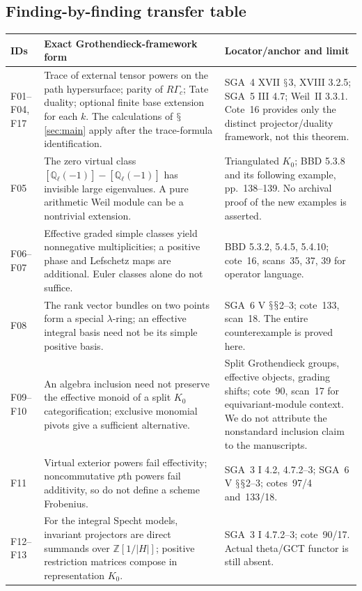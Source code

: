 \documentclass[11pt,a4paper]{article}
\newcommand{\Q}{\mathbb Q}\newcommand{\Z}{\mathbb Z}\newcommand{\C}{\mathbb C}\newcommand{\N}{\mathbb N}\newcommand{\F}{\mathbb F}
\renewcommand{\S}{\ensuremath{\mathsection}}
\theoremstyle{named}\newtheorem{finding}{Finding}[section]
\theoremstyle{definition}\newtheorem{definition}[finding]{Definition}
\theoremstyle{remark}\newtheorem{remark}[finding]{Remark}
\begin{document}
\subsection{Finding-by-finding transfer table}
{\small\begin{longtable}{p{.12\linewidth}p{.48\linewidth}p{.32\linewidth}}
\toprule IDs&Exact Grothendieck-framework form&Locator/anchor and limit\\\midrule\endhead
F01--F04, F17&Trace of external tensor powers on the path hypersurface; parity of $R\Gamma_c$; Tate duality; optional finite base extension for each $k$. The calculations of \S\ref{sec:main} apply after the trace-formula identification.&SGA~4 XVII \S3, XVIII 3.2.5; SGA~5 III 4.7; Weil~II 3.3.1. Cote~16 provides only the distinct projector/duality framework, not this theorem.\\
F05&The zero virtual class $[\Q_\ell(-1)]-[\Q_\ell(-1)]$ has invisible large eigenvalues. A pure arithmetic Weil module can be a nontrivial extension.&Triangulated $K_0$; BBD 5.3.8 and its following example, pp.~138--139. No archival proof of the new examples is asserted.\\
F06--F07&Effective graded simple classes yield nonnegative multiplicities; a positive phase and Lefschetz maps are additional. Euler classes alone do not suffice.&BBD 5.3.2, 5.4.5, 5.4.10; cote~16, scans~35, 37, 39 for operator language.\\
F08&The rank vector bundles on two points form a special $\lambda$-ring; an effective integral basis need not be its simple positive basis.&SGA~6 V \S\S2--3; cote~133, scan~18. The entire counterexample is proved here.\\
F09--F10&An algebra inclusion need not preserve the effective monoid of a split $K_0$ categorification; exclusive monomial pivots give a sufficient alternative.&Split Grothendieck groups, effective objects, grading shifts; cote~90, scan~17 for equivariant-module context. We do not attribute the nonstandard inclusion claim to the manuscripts.\\
F11&Virtual exterior powers fail effectivity; noncommutative $p$th powers fail additivity, so do not define a scheme Frobenius.&SGA~3 I 4.2, 4.7.2--3; SGA~6 V \S\S2--3; cotes~97/4 and~133/18.\\
F12--F13&For the integral Specht models, invariant projectors are direct summands over $\Z[1/|H|]$; positive restriction matrices compose in representation $K_0$.&SGA~3 I 4.7.2--3; cote~90/17. Actual theta/GCT functor is still absent.\\

\end{longtable}}
\end{document}
